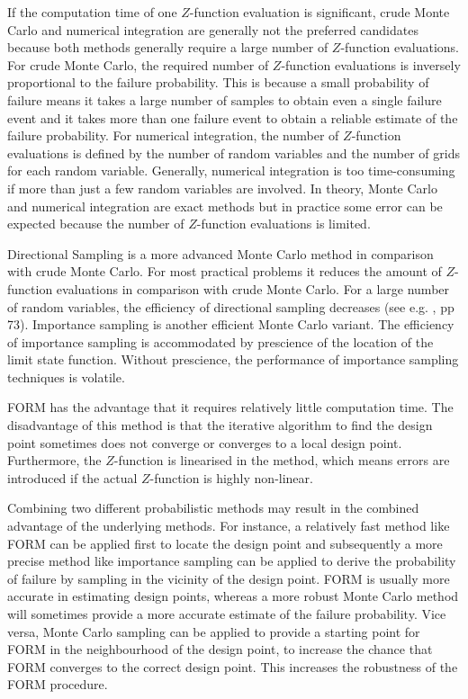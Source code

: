 If the computation time of one $Z$-function evaluation is significant, crude Monte Carlo and numerical integration are generally not the preferred candidates because both methods generally require a large number of $Z$-function evaluations. For crude Monte Carlo, the required number of $Z$-function evaluations is inversely proportional to the failure probability. This is because a small probability of failure means it takes a large number of samples to obtain even a single failure event and it takes more than one failure event to obtain a reliable estimate of the failure probability. For numerical integration, the number of $Z$-function evaluations is defined by the number of random variables and the number of grids for each random variable. Generally, numerical integration is too time-consuming if more than just a few random variables are involved. In theory, Monte Carlo and numerical integration are exact methods but in practice some error can be expected because the number of $Z$-function evaluations is limited. 

Directional Sampling is a more advanced Monte Carlo method in comparison with crude Monte Carlo. For most practical problems it reduces the amount of $Z$-function evaluations in comparison with crude Monte Carlo. For a large number of random variables, the efficiency of directional sampling decreases (see e.g. \cite{Waarts2000}, pp 73). Importance sampling is another efficient Monte Carlo variant. The efficiency of importance sampling is accommodated by prescience of the location of the limit state function. Without prescience, the performance of importance sampling techniques is volatile.

FORM has the advantage that it requires relatively little computation time. The disadvantage of this method is that the iterative algorithm to find the design point sometimes does not converge or converges to a local design point. Furthermore, the $Z$-function is linearised in the method, which means errors are introduced if the actual $Z$-function is highly non-linear.

Combining two different probabilistic methods may result in the combined advantage of the underlying methods. For instance, a relatively fast method like FORM can be applied first to locate the design point and subsequently a more precise method like importance sampling can be applied to derive the probability of failure by sampling in the vicinity of the design point. FORM is usually more accurate in estimating design points, whereas a more robust Monte Carlo method will sometimes provide a more accurate estimate of the failure probability. Vice versa, Monte Carlo sampling can be applied to provide a starting point for FORM in the neighbourhood of the design point, to increase the chance that FORM converges to the correct design point. This increases the robustness of the FORM procedure.




